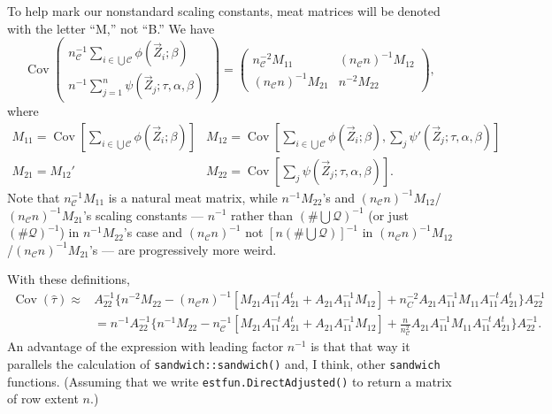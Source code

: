 \documentclass{article}
\begin{document}
To help mark our nonstandard scaling constants, 
meat matrices will be denoted with the letter ``M,'' not ``B.''
We have
\[
\operatorname{Cov}\left(
     \begin{array}{c}
       n_{\mathcal{C}}^{-1}\sum_{i\in \bigcup \mathcal{C}}\phi(\vec{Z}_{i}; \beta )\\
       n^{-1}\sum_{j=1}^{n}\psi(\vec{Z}_{j}; \tau, \alpha, \beta )
     \end{array}
\right) = \left(
  \begin{array}{cc}
    n_{\mathcal{C}}^{-2}M_{11}& (n_{\mathcal{C}}n)^{-1}M_{12}\\
    (n_{\mathcal{C}}n)^{-1}M_{21} & n^{-2}M_{22}
  \end{array}
\right),
\]
where
\[
  \begin{array}{cc}
    M_{11}  = \operatorname{Cov}[\sum_{i\in \bigcup
             \mathcal{C}} \phi(\vec{Z}_{i}; \beta )] &
                                                                  M_{12}=
                                                                  \operatorname{Cov}[\sum_{i\in \bigcup
             \mathcal{C}}\phi(\vec{Z}_{i};
                                                                  \beta
                                                                  ), \sum_{j}\psi'(\vec{Z}_{j}; \tau, \alpha, \beta )]\\
    M_{21}=M_{12}' & M_{22} = \operatorname{Cov}[\sum_{j}\psi(\vec{Z}_{j};
                     \tau, \alpha, \beta )] .
    \end{array}
\]
Note that $n_{\mathcal{C}}^{-1}M_{11}$ is a natural meat matrix, while $n^{-1}M_{22}$'s and
$(n_{\mathcal{C}}n)^{-1}M_{12}$/$(n_{\mathcal{C}}n)^{-1}M_{21}$'s scaling constants --- $n^{-1}$ rather than $(\# \bigcup
\mathcal{Q})^{-1}$ (or just $(\# \mathcal{Q})^{-1}$) in $n^{-1}M_{22}$'s
case and $(n_{\mathcal{C}}n)^{-1}$ not $[n (\# \bigcup
\mathcal{Q})]^{-1}$ in $(n_{\mathcal{C}}n)^{-1}M_{12}$/$(n_{\mathcal{C}}n)^{-1}M_{21}$'s --- are progressively more weird.

With these definitions,
\begin{align}
  \operatorname{Cov}(\hat\tau) \approx& A_{22}^{-1}\{n^{-2} M_{22} -
                                 (n_{\mathcal{C}}n)^{-1}[M_{21}A_{11}^{-t}A_{21}^t
                                 + A_{21}A_{11}^{-1}M_{12}] +
                                 n_C^{-2}A_{21}A_{11}^{-1}M_{11}A_{11}^{-t}A_{21}^{t}\}A_{22}^{-1}\nonumber
  \\
                               &= n^{-1}A_{22}^{-1}\{
                                 n^{-1}M_{22} -
                                 n_{\mathcal{C}}^{-1}[M_{21}A_{11}^{-t}A_{21}^t
                                 + A_{21}A_{11}^{-1}M_{12}] +
                                 \frac{n}{n_{\mathcal{C}}^{2}}A_{21}A_{11}^{-1}M_{11}A_{11}^{-t}A_{21}^{t}\}A_{22}^{-1}
                                . \label{eq:6}
\end{align}
An advantage of the expression with leading factor $n^{-1}$ is that
that way it parallels the calculation of
\texttt{sandwich::sandwich()} and, I think, other \texttt{sandwich}
functions. (Assuming that we write
\texttt{estfun.DirectAdjusted()}  to return a matrix of row extent
$n$.) 
\end{document}
